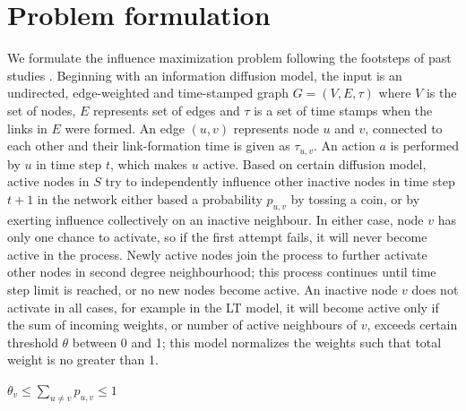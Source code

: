 	\section{Problem formulation}
	\label{sec:proof-formulation}
	We formulate the influence maximization problem following the footsteps of past studies \cite{domingos2001,kempe2003}. Beginning with an information diffusion model, the input is an undirected, edge-weighted and time-stamped graph $G=(V,E,\tau)$ where $V$ is the set of nodes, $E$ represents set of edges and $\tau$ is a set of time stamps when the links in $E$ were formed. An edge $(u,v)$ represents node $u$ and $v$, connected to each other and their link-formation time is given as $\tau_{u,v}$. An action $a$ is performed by $u$ in time step $t$, which makes $u$ active. Based on certain diffusion model, active nodes in $S$ try to independently influence other inactive nodes in time step $t+1$ in the network either based a probability $p_{u,v}$ by tossing a coin, or by exerting influence collectively on an inactive neighbour. In either case, node $v$ has only one chance to activate, so if the first attempt fails, it will never become active in the process. Newly active nodes join the process to further activate other nodes in second degree neighbourhood; this process continues until time step limit is reached, or no new nodes become active. An inactive node $v$ does not activate in all cases, for example in the LT model, it will become active only if the sum of incoming weights, or number of active neighbours of $v$, exceeds certain threshold $\theta$ between 0 and 1; this model normalizes the weights such that total weight is no greater than 1.
	
	
	\begin{center}
		$\theta_v \leq \sum_{u\neq v} p_{u,v} \leq 1$
	\end{center}
	

